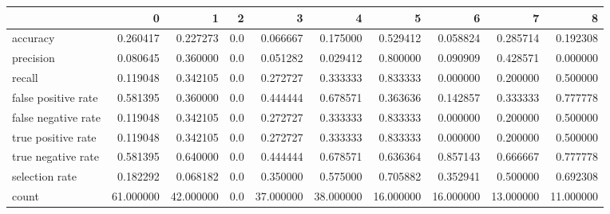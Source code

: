 \begin{tabular}{lrrrrrrrrr}
\toprule
{} &          0 &          1 &    2 &          3 &          4 &          5 &          6 &          7 &          8 \\
\midrule
accuracy            &   0.260417 &   0.227273 &  0.0 &   0.066667 &   0.175000 &   0.529412 &   0.058824 &   0.285714 &   0.192308 \\
precision           &   0.080645 &   0.360000 &  0.0 &   0.051282 &   0.029412 &   0.800000 &   0.090909 &   0.428571 &   0.000000 \\
recall              &   0.119048 &   0.342105 &  0.0 &   0.272727 &   0.333333 &   0.833333 &   0.000000 &   0.200000 &   0.500000 \\
false positive rate &   0.581395 &   0.360000 &  0.0 &   0.444444 &   0.678571 &   0.363636 &   0.142857 &   0.333333 &   0.777778 \\
false negative rate &   0.119048 &   0.342105 &  0.0 &   0.272727 &   0.333333 &   0.833333 &   0.000000 &   0.200000 &   0.500000 \\
true positive rate  &   0.119048 &   0.342105 &  0.0 &   0.272727 &   0.333333 &   0.833333 &   0.000000 &   0.200000 &   0.500000 \\
true negative rate  &   0.581395 &   0.640000 &  0.0 &   0.444444 &   0.678571 &   0.636364 &   0.857143 &   0.666667 &   0.777778 \\
selection rate      &   0.182292 &   0.068182 &  0.0 &   0.350000 &   0.575000 &   0.705882 &   0.352941 &   0.500000 &   0.692308 \\
count               &  61.000000 &  42.000000 &  0.0 &  37.000000 &  38.000000 &  16.000000 &  16.000000 &  13.000000 &  11.000000 \\
\bottomrule
\end{tabular}
